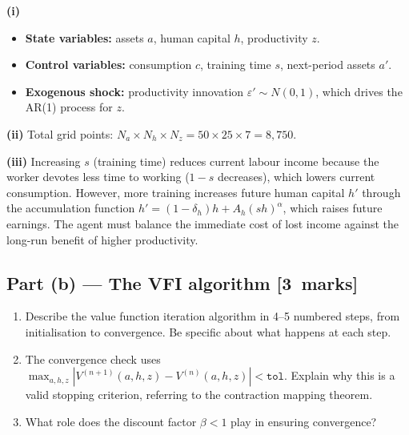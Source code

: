 \documentclass[11pt,a4paper]{article}
\newcommand{\mkpts}[1]{\hfill\textbf{[#1~marks]}}
\begin{document}
\begin{solution}
\textbf{(i)}
\begin{itemize}[nosep]
\item \textbf{State variables:} assets $a$, human capital $h$, productivity $z$.
\item \textbf{Control variables:} consumption $c$, training time $s$, next-period assets $a'$.
\item \textbf{Exogenous shock:} productivity innovation $\varepsilon' \sim N(0,1)$, which drives the AR(1) process for $z$.
\end{itemize}

\textbf{(ii)} Total grid points: $N_a \times N_h \times N_z = 50 \times 25 \times 7 = \boxed{8{,}750}$.

\medskip

\textbf{(iii)} Increasing $s$ (training time) reduces current labour income because the worker devotes less time to working ($1-s$ decreases), which lowers current consumption.  However, more training increases future human capital $h'$ through the accumulation function $h' = (1-\delta_h)h + A_h(sh)^\alpha$, which raises future earnings.  The agent must balance the immediate cost of lost income against the long-run benefit of higher productivity.
\end{solution}

\subsection*{Part (b) --- The VFI algorithm \mkpts{3}}

\begin{enumerate}[label=(\roman*),nosep]
\item Describe the value function iteration algorithm in 4--5 numbered steps, from initialisation to convergence.  Be specific about what happens at each step.
\item The convergence check uses $\max_{a,h,z} |V^{(n+1)}(a,h,z) - V^{(n)}(a,h,z)| < \texttt{tol}$.  Explain why this is a valid stopping criterion, referring to the contraction mapping theorem.
\item What role does the discount factor $\beta < 1$ play in ensuring convergence?
\end{enumerate}
\end{document}
